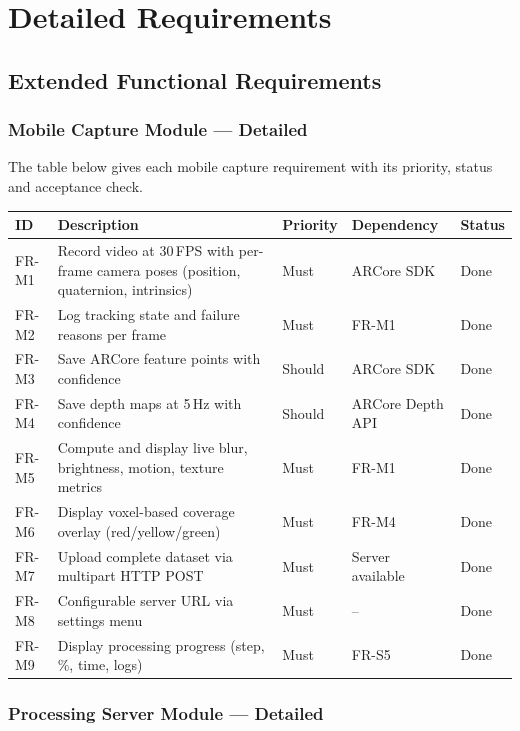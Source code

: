 \chapter{Detailed Requirements}

\section{Extended Functional Requirements}

\subsection{Mobile Capture Module --- Detailed}

The table below gives each mobile capture requirement with its priority, status and acceptance check.

\begin{longtable}{p{}p{}p{}p{}p{}}
\toprule
\textbf{ID} & \textbf{Description} & \textbf{Priority} & \textbf{Dependency} & \textbf{Status} \\
\midrule
FR-M1 & Record video at 30\,FPS with per-frame camera poses (position, quaternion, intrinsics) & Must & ARCore SDK & Done \\
FR-M2 & Log tracking state and failure reasons per frame & Must & FR-M1 & Done \\
FR-M3 & Save ARCore feature points with confidence & Should & ARCore SDK & Done \\
FR-M4 & Save depth maps at 5\,Hz with confidence & Should & ARCore Depth API & Done \\
FR-M5 & Compute and display live blur, brightness, motion, texture metrics & Must & FR-M1 & Done \\
FR-M6 & Display voxel-based coverage overlay (red/yellow/green) & Must & FR-M4 & Done \\
FR-M7 & Upload complete dataset via multipart HTTP POST & Must & Server available & Done \\
FR-M8 & Configurable server URL via settings menu & Must & -- & Done \\
FR-M9 & Display processing progress (step, \%, time, logs) & Must & FR-S5 & Done \\
\bottomrule
\end{longtable}

\subsection{Processing Server Module --- Detailed}

